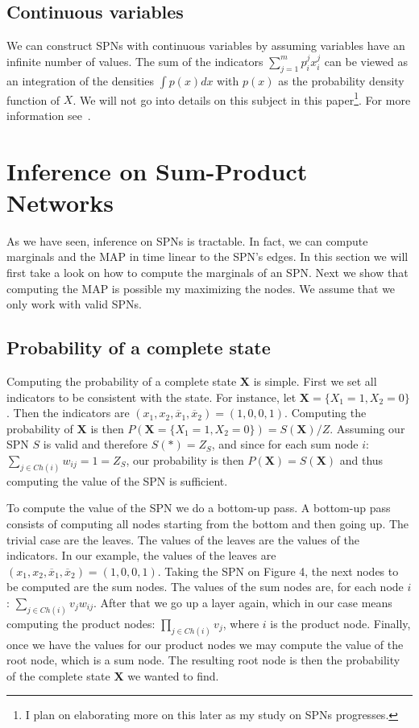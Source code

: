 \documentclass[a4paper,10pt]{article}
\theoremstyle{plain}
\begin{document}
\subsection{Continuous variables}

We can construct SPNs with continuous variables by assuming variables have an infinite number of
values. The sum of the indicators $\sum_{j=1}^m p_i^j x_i^j$ can be viewed as an integration of the
densities $\int p(x)dx$ with $p(x)$ as the probability density function of $X$. We will not go into
details on this subject in this paper\footnote{I plan on elaborating more on this later as my
study on SPNs progresses.}. For more information see~\cite{poon-domingos}.

\newpage

\section{Inference on Sum-Product Networks}

As we have seen, inference on SPNs is tractable. In fact, we can compute marginals and the MAP in
time linear to the SPN's edges. In this section we will first take a look on how to compute the
marginals of an SPN\@. Next we show that computing the MAP is possible my maximizing the nodes. We
assume that we only work with valid SPNs\@.

\subsection{Probability of a complete state}

Computing the probability of a complete state $\mathbf{X}$ is simple. First we set all indicators
to be consistent with the state. For instance, let $\mathbf{X}=\{X_1=1,X_2=0\}$. Then the
indicators are $(x_1,x_2,\overline{x}_1,\overline{x}_2)=(1, 0, 0, 1)$. Computing the probability of
$\mathbf{X}$ is then $P(\mathbf{X}=\{X_1=1,X_2=0\})=S(\mathbf{X})/Z$. Assuming our SPN $S$ is valid
and therefore $S(*)=Z_S$, and since for each sum node $i$: $\sum_{j\in Ch(i)}w_{ij}=1=Z_S$, our
probability is then $P(\mathbf{X})=S(\mathbf{X})$ and thus computing the value of the SPN is
sufficient.

To compute the value of the SPN we do a bottom-up pass. A bottom-up pass consists of computing all
nodes starting from the bottom and then going up. The trivial case are the leaves. The values of
the leaves are the values of the indicators. In our example, the values of the leaves are
$(x_1,x_2,\overline{x}_1,\overline{x}_2)=(1,0,0,1)$. Taking the SPN on Figure 4, the next nodes to
be computed are the sum nodes. The values of the sum nodes are, for each node $i$: $\sum_{j\in
Ch(i)}v_j w_{ij}$. After that we go up a layer again, which in our case means computing the product
nodes: $\prod_{j\in Ch(i)}v_j$, where $i$ is the product node. Finally, once we have the values for
our product nodes we may compute the value of the root node, which is a sum node. The resulting
root node is then the probability of the complete state $\mathbf{X}$ we wanted to find.
\end{document}
